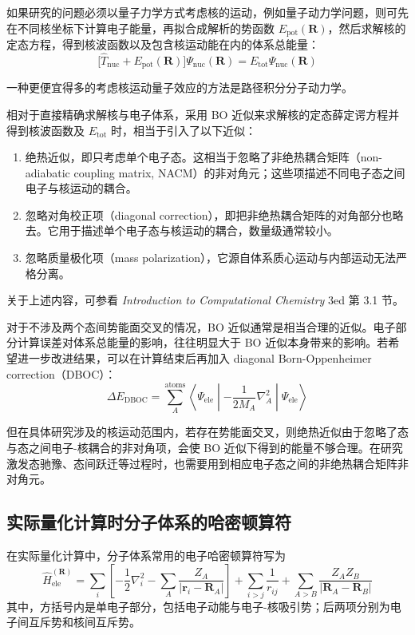 如果研究的问题必须以量子力学方式考虑核的运动，例如量子动力学问题，则可先在不同核坐标下计算电子能量，再拟合成解析的势函数 $E_{\mathrm{pot}}(\mathbf R)$，然后求解核的定态方程，得到核波函数以及包含核运动能在内的体系总能量：
\[
\bigl[\hat T_{\mathrm{nuc}}+E_{\mathrm{pot}}(\mathbf R)\bigr]\Psi_{\mathrm{nuc}}(\mathbf R)
=
E_{\mathrm{tot}}\Psi_{\mathrm{nuc}}(\mathbf R)
\]

一种更便宜得多的考虑核运动量子效应的方法是路径积分分子动力学。

相对于直接精确求解核与电子体系，采用 BO 近似来求解核的定态薛定谔方程并得到核波函数及 $E_{\mathrm{tot}}$ 时，相当于引入了以下近似：

\begin{enumerate}
  \item 绝热近似，即只考虑单个电子态。这相当于忽略了非绝热耦合矩阵（non-adiabatic coupling matrix, NACM）的非对角元；这些项描述不同电子态之间电子与核运动的耦合。
  \item 忽略对角校正项（diagonal correction），即把非绝热耦合矩阵的对角部分也略去。它用于描述单个电子态与核运动的耦合，数量级通常较小。
  \item 忽略质量极化项（mass polarization），它源自体系质心运动与内部运动无法严格分离。
\end{enumerate}

关于上述内容，可参看 \textit{Introduction to Computational Chemistry} 3ed 第 3.1 节。

对于不涉及两个态间势能面交叉的情况，BO 近似通常是相当合理的近似。电子部分计算误差对体系总能量的影响，往往明显大于 BO 近似本身带来的影响。若希望进一步改进结果，可以在计算结束后再加入 diagonal Born-Oppenheimer correction（DBOC）：
\[
\Delta E_{\mathrm{DBOC}}
=
\sum_A^{\mathrm{atoms}}
\left\langle
\Psi_{\mathrm{ele}}
\middle|
-\frac{1}{2M_A}\nabla_A^2
\middle|
\Psi_{\mathrm{ele}}
\right\rangle
\]

但在具体研究涉及的核运动范围内，若存在势能面交叉，则绝热近似由于忽略了态与态之间电子-核耦合的非对角项，会使 BO 近似下得到的能量不够合理。在研究激发态驰豫、态间跃迁等过程时，也需要用到相应电子态之间的非绝热耦合矩阵非对角元。

\subsection*{实际量化计算时分子体系的哈密顿算符}

在实际量化计算中，分子体系常用的电子哈密顿算符写为
\[
\hat H_{\mathrm{ele}}^{(\mathbf R)}
=
\sum_i
\left[
-\frac{1}{2}\nabla_i^2
-\sum_A \frac{Z_A}{|\mathbf r_i-\mathbf R_A|}
\right]
+
\sum_{i>j}\frac{1}{r_{ij}}
+
\sum_{A>B}\frac{Z_AZ_B}{|\mathbf R_A-\mathbf R_B|}
\]
其中，方括号内是单电子部分，包括电子动能与电子-核吸引势；后两项分别为电子间互斥势和核间互斥势。

